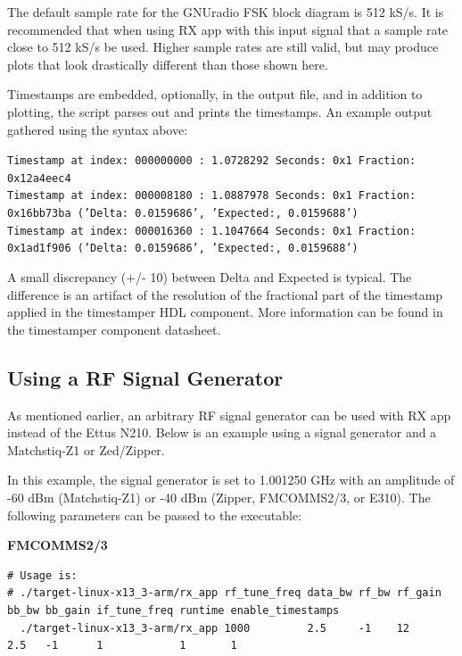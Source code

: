 \noindent The default sample rate for the GNUradio FSK block diagram is 512 kS/s. It is recommended that when using RX app with this input signal that a sample rate close to 512 kS/s be used. Higher sample rates are still valid, but may produce plots that look drastically different than those shown here.\par\medskip
\newpage
\noindent Timestamps are embedded, optionally, in the output file, and in addition to plotting, the script parses out and prints the timestamps. An example output gathered using the syntax above:\par\medskip
\scriptsize\noindent\texttt{Timestamp at index: 000000000 :  1.0728292 Seconds: 0x1 Fraction: 0x12a4eec4  \\
Timestamp at index: 000008180 :  1.0887978 Seconds: 0x1 Fraction: 0x16bb73ba ('Delta: 0.0159686', 'Expected:, 0.0159688')\\
Timestamp at index: 000016360 :  1.1047664 Seconds: 0x1 Fraction: 0x1ad1f906 ('Delta: 0.0159686', 'Expected:, 0.0159688')}\par\medskip
\noindent\small A small discrepancy (+/- 10) between Delta and Expected is typical. The difference is an artifact of the resolution of the fractional part of the timestamp applied in the timestamper HDL component. More information can be found in the timestamper component datasheet.\par\medskip
\par\medskip

\subsection{Using a RF Signal Generator}
\noindent As mentioned earlier, an arbitrary RF signal generator can be used with RX app instead of the Ettus N210. Below is an example using a signal generator and a Matchstiq-Z1 or Zed/Zipper.\par\medskip
\noindent In this example, the signal generator is set to 1.001250 GHz with an amplitude of -60 dBm (Matchstiq-Z1) or -40 dBm (Zipper, FMCOMMS2/3, or E310). The following parameters can be passed to the executable:\par\medskip

\small
\noindent\textbf{FMCOMMS2/3}
\scriptsize
\begin{verbatim}
# Usage is:
# ./target-linux-x13_3-arm/rx_app rf_tune_freq data_bw rf_bw rf_gain bb_bw bb_gain if_tune_freq runtime enable_timestamps
  ./target-linux-x13_3-arm/rx_app 1000         2.5     -1    12      2.5   -1      1            1       1
\end{verbatim}
\par\medskip
\small


